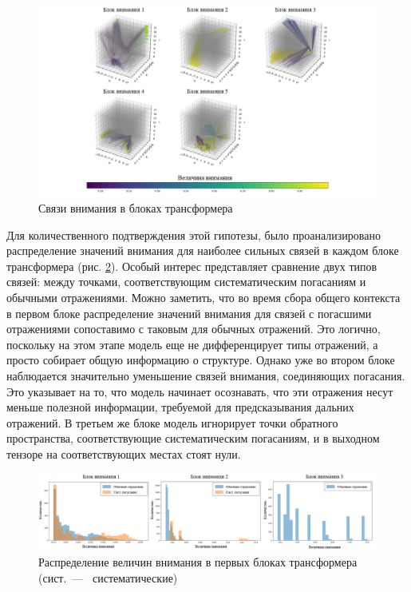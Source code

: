\begin{figure}[H]
    \centering
    \includegraphics[width=1\textwidth]{figures/attention.png}
    \caption{Связи внимания в блоках трансформера}
    \label{attention_maps}
\end{figure}

Для количественного подтверждения этой гипотезы, было проанализировано распределение значений внимания для наиболее сильных связей в каждом блоке трансформера (рис. \ref{attention_hist}). Особый интерес представляет сравнение двух типов связей: между точками, соответствующим систематическим погасаниям и обычными отражениями. Можно заметить, что во время сбора общего контекста в первом блоке распределение значений внимания для связей с погасшими отражениями сопоставимо с таковым для обычных отражений. Это логично, поскольку на этом этапе модель еще не дифференцирует типы отражений, а просто собирает общую информацию о структуре. Однако уже во втором блоке наблюдается значительно уменьшение связей внимания, соединяющих погасания. Это указывает на то, что модель начинает осознавать, что эти отражения несут меньше полезной информации, требуемой для предсказывания дальних отражений. В третьем же блоке модель игнорирует точки обратного пространства, соответствующие систематическим погасаниям, и в выходном тензоре на соответствующих местах стоят нули. 

\begin{figure}[H]
    \centering
    \includegraphics[width=1\textwidth]{figures/attention_hist.png}
    \caption{Распределение величин внимания в первых блоках трансформера (сист.~---~ систематические)}
    \label{attention_hist}
\end{figure}

